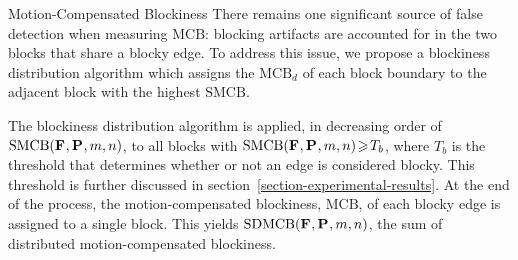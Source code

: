 \documentclass{article}
\begin{document}
\begin{section}{Motion-Compensated Blockiness}
There remains one significant source of false detection when measuring 
$\textrm{MCB}$: blocking artifacts are accounted for in the two blocks that
share a blocky edge. To address this issue, we propose a blockiness distribution
algorithm which assigns the $\textrm{MCB}_d$ of each block boundary to the
adjacent block with the highest $\textrm{SMCB}$.

The blockiness distribution algorithm is applied, in decreasing order of
$\textrm{SMCB}(\mathbf{F}_{},\mathbf{P}_{},m,n)$, to all blocks with 
\mbox{$\textrm{SMCB}(\mathbf{F}_{},\mathbf{P}_{},m,n) 
\!\geqslant\!T_b$}, where $T_b$
is the threshold that determines whether or not an edge is considered blocky.
This threshold is further discussed in 
section~\ref{section-experimental-results}.
At the end of the process, the motion-compensated blockiness,
$\textrm{MCB}$, of each blocky edge is assigned to a single block. This yields 
$\textrm{SDMCB}(\mathbf{F}_{},\mathbf{P}_{},m,n)$, the sum of distributed motion-compensated 
blockiness. 
\end{section}
\end{document}
